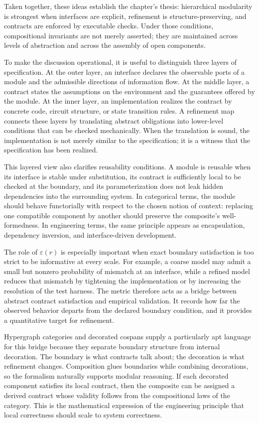 \documentclass[11pt]{article}
\begin{document}
Taken together, these ideas establish the chapter’s thesis: hierarchical modularity is strongest when interfaces are explicit, refinement is structure-preserving, and contracts are enforced by executable checks. Under those conditions, compositional invariants are not merely asserted; they are maintained across levels of abstraction and across the assembly of open components.

To make the discussion operational, it is useful to distinguish three layers of specification. At the outer layer, an interface declares the observable ports of a module and the admissible directions of information flow. At the middle layer, a contract states the assumptions on the environment and the guarantees offered by the module. At the inner layer, an implementation realizes the contract by concrete code, circuit structure, or state transition rules. A refinement map connects these layers by translating abstract obligations into lower-level conditions that can be checked mechanically. When the translation is sound, the implementation is not merely similar to the specification; it is a witness that the specification has been realized.

This layered view also clarifies reusability conditions. A module is reusable when its interface is stable under substitution, its contract is sufficiently local to be checked at the boundary, and its parameterization does not leak hidden dependencies into the surrounding system. In categorical terms, the module should behave functorially with respect to the chosen notion of context: replacing one compatible component by another should preserve the composite’s well-formedness. In engineering terms, the same principle appears as encapsulation, dependency inversion, and interface-driven development.

The role of \(\varepsilon(r)\) is especially important when exact boundary satisfaction is too strict to be informative at every scale. For example, a coarse model may admit a small but nonzero probability of mismatch at an interface, while a refined model reduces that mismatch by tightening the implementation or by increasing the resolution of the test harness. The metric therefore acts as a bridge between abstract contract satisfaction and empirical validation. It records how far the observed behavior departs from the declared boundary condition, and it provides a quantitative target for refinement.

Hypergraph categories and decorated cospans supply a particularly apt language for this bridge because they separate boundary structure from internal decoration. The boundary is what contracts talk about; the decoration is what refinement changes. Composition glues boundaries while combining decorations, so the formalism naturally supports modular reasoning. If each decorated component satisfies its local contract, then the composite can be assigned a derived contract whose validity follows from the compositional laws of the category. This is the mathematical expression of the engineering principle that local correctness should scale to system correctness.
\end{document}
